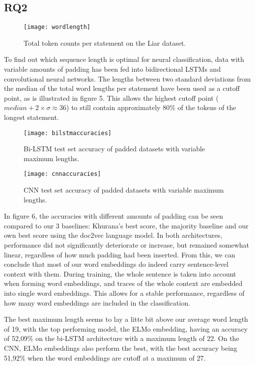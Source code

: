 \subsection{RQ2}

\begin{figure}[b!]
    \centering
    \texttt{[image: wordlength]}
    \caption{Total token counts per statement on the Liar dataset.}
\end{figure}

To find out which sequence length is optimal for neural classification, data with variable amounts of padding has been fed into bidirectional LSTMs and convolutional neural networks.
The lengths between two standard deviations from the median of the total word lengths per statement have been used as a cutoff point, as is illustrated in figure 5. 
This allows the highest cutoff point (\(median + 2 \times \sigma \approx 36\)) to still contain approximately 80\% of the tokens of the longest statement.

\begin{figure}[b]
    \texttt{[image: bilstmaccuracies]}
    \caption{Bi-LSTM test set accuracy of padded datasets with variable maximum lengths.}
\end{figure}
    
\begin{figure}[b]
    \texttt{[image: cnnaccuracies]}
    \caption{CNN test set accuracy of padded datasets with variable maximum lengths.}
\end{figure}

In figure 6, the accuracies with different amounts of padding can be seen compared to our 3 baselines: Khurana's best score, the majority baseline and our own best score using the doc2vec language model.
In both architectures, performance did not significantly deteriorate or increase, but remained somewhat linear, regardless of how much padding had been inserted.
From this, we can conclude that most of our word embeddings do indeed carry sentence-level context with them.
During training, the whole sentence is taken into account when forming word embeddings, and traces of the whole context are embedded into single word embeddings.
This allows for a stable performance, regardless of how many word embeddings are included in the classification.

The best maximum length seems to lay a litte bit above our average word length of 19, with the top performing model, the ELMo embedding, having an accuracy of 52,09\% on the bi-LSTM architecture with a maximum length of 22.
On the CNN, ELMo embeddings also perform the best, with the best accuracy being 51,92\% when the word embeddings are cutoff at a maximum of 27. 

